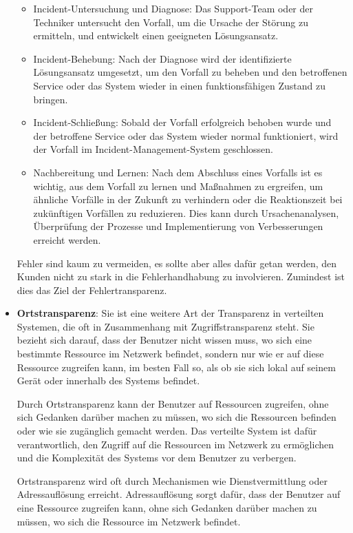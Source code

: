 \begin{itemize}
\begin{itemize}
\item Incident-Untersuchung und Diagnose: Das Support-Team oder der Techniker untersucht den Vorfall, um die Ursache der Störung zu ermitteln, und entwickelt einen geeigneten Lösungsansatz.
\item Incident-Behebung: Nach der Diagnose wird der identifizierte Lösungsansatz umgesetzt, um den Vorfall zu beheben und den betroffenen Service oder das System wieder in einen funktionsfähigen Zustand zu bringen.
\item Incident-Schließung: Sobald der Vorfall erfolgreich behoben wurde und der betroffene Service oder das System wieder normal funktioniert, wird der Vorfall im Incident-Management-System geschlossen.
\item Nachbereitung und Lernen: Nach dem Abschluss eines Vorfalls ist es wichtig, aus dem Vorfall zu lernen und Maßnahmen zu ergreifen, um ähnliche Vorfälle in der Zukunft zu verhindern oder die Reaktionszeit bei zukünftigen Vorfällen zu reduzieren. Dies kann durch Ursachenanalysen, Überprüfung der Prozesse und Implementierung von Verbesserungen erreicht werden.
\end{itemize}
Fehler sind kaum zu vermeiden, es sollte aber alles dafür getan werden, den Kunden nicht zu stark in die Fehlerhandhabung zu involvieren. Zumindest ist dies das Ziel der Fehlertransparenz.

\item \textbf{Ortstransparenz}: Sie ist eine weitere Art der Transparenz in verteilten Systemen, die oft in Zusammenhang mit Zugriffstransparenz steht. Sie bezieht sich darauf, dass der Benutzer nicht wissen muss, wo sich eine bestimmte Ressource im Netzwerk befindet, sondern nur wie er auf diese Ressource zugreifen kann, im besten Fall so, als ob sie sich lokal auf seinem Gerät oder innerhalb des Systems befindet.

Durch Ortstransparenz kann der Benutzer auf Ressourcen zugreifen, ohne sich Gedanken darüber machen zu müssen, wo sich die Ressourcen befinden oder wie sie zugänglich gemacht werden. Das verteilte System ist dafür verantwortlich, den Zugriff auf die Ressourcen im Netzwerk zu ermöglichen und die Komplexität des Systems vor dem Benutzer zu verbergen.

Ortstransparenz wird oft durch Mechanismen wie Dienstvermittlung oder Adressauflösung erreicht. Adressauflösung sorgt dafür, dass der Benutzer auf eine Ressource zugreifen kann, ohne sich Gedanken darüber machen zu müssen, wo sich die Ressource im Netzwerk befindet. 


\end{itemize}
